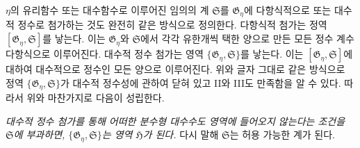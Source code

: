 
$\eta$의 유리함수 또는 대수함수로 이루어진 임의의 계 $\mathfrak S$를 $\mathfrak G_\eta$에 다항식적으로 또는 대수적 정수로 첨가하는 것도 완전히 같은 방식으로 정의한다. 다항식적 첨가는 정역 $[\mathfrak G_\eta,\mathfrak S]$를 낳는다. 이는 $\mathfrak G_\eta$와 $\mathfrak S$에서 각각 유한개씩 택한 양으로 만든 모든 정수 계수 다항식으로 이루어진다. 대수적 정수 첨가는 영역 $\{\mathfrak G_\eta,\mathfrak S\}$를 낳는다. 이는 $[\mathfrak G_\eta,\mathfrak S]$에 대하여 대수적으로 정수인 모든 양으로 이루어진다. 위와 글자 그대로 같은 방식으로 정역 $\{\mathfrak G_\eta,\mathfrak S\}$가 대수적 정수성에 관하여 닫혀 있고 II와 III도 만족함을 알 수 있다. 따라서 위와 마찬가지로 다음이 성립한다.

\emph{대수적 정수 첨가를 통해 어떠한 분수형 대수수도 영역에 들어오지 않는다는 조건을 $\mathfrak S$에 부과하면, $\{\mathfrak G_\eta,\mathfrak S\}$는 영역 $\mathfrak H$가 된다.} 다시 말해 $\mathfrak S$는 허용 가능한 계가 된다.
